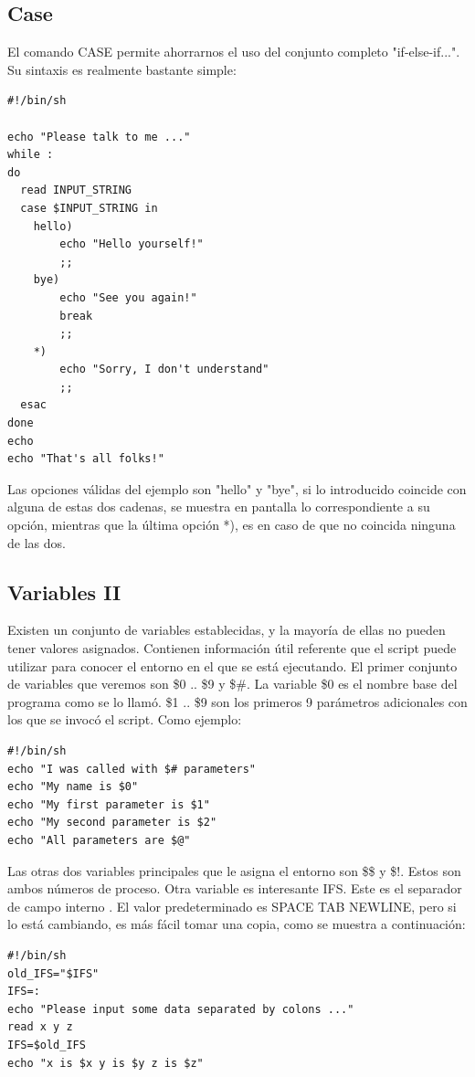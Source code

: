 \documentclass[12pt]{article}
\begin{document}
\subsection*{Case}
El comando CASE permite ahorrarnos el uso del conjunto completo "if-else-if...". Su sintaxis es realmente bastante simple:
\begin{verbatim}
#!/bin/sh

echo "Please talk to me ..."
while :
do
  read INPUT_STRING
  case $INPUT_STRING in
	hello)
		echo "Hello yourself!"
		;;
	bye)
		echo "See you again!"
		break
		;;
	*)
		echo "Sorry, I don't understand"
		;;
  esac
done
echo 
echo "That's all folks!"
\end{verbatim}
Las opciones válidas del ejemplo son "hello" y "bye", si lo introducido coincide con alguna de estas dos cadenas, se muestra en pantalla lo correspondiente a su opción, mientras que la última opción *), es en caso de que no coincida ninguna de las dos.

\subsection*{Variables II}
Existen un conjunto de variables establecidas, y la mayoría de ellas no pueden tener valores asignados. Contienen información útil referente que el script puede utilizar para conocer el entorno en el que se está ejecutando. El primer conjunto de variables que veremos son \$0 .. \$9 y \$\#. La variable \$0 es el nombre base del programa como se lo llamó. \$1 .. \$9 son los primeros 9 parámetros adicionales con los que se invocó el script. Como ejemplo:
\begin{verbatim}
#!/bin/sh
echo "I was called with $# parameters"
echo "My name is $0"
echo "My first parameter is $1"
echo "My second parameter is $2"
echo "All parameters are $@"
\end{verbatim}
Las otras dos variables principales que le asigna el entorno son \$\$ y \$!. Estos son ambos números de proceso. Otra variable es interesante IFS. Este es el separador de campo interno . El valor predeterminado es SPACE TAB NEWLINE, pero si lo está cambiando, es más fácil tomar una copia, como se muestra a continuación:
\begin{verbatim}
#!/bin/sh
old_IFS="$IFS"
IFS=:
echo "Please input some data separated by colons ..."
read x y z
IFS=$old_IFS
echo "x is $x y is $y z is $z"
\end{verbatim}
\end{document}
